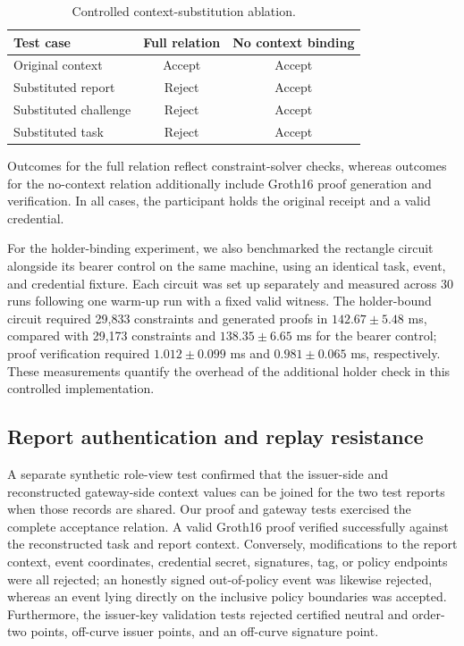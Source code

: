 \documentclass[pdflatex,iicol,sn-mathphys-num]{sn-jnl}
\begin{document}
\begin{table}[t]
\centering\footnotesize\setlength{\tabcolsep}{3pt}\caption{Controlled context-substitution ablation.}\label{tab:context-ablation}
\begin{tabular}{@{}lcc@{}}\toprule
Test case & Full relation & No context binding \\\midrule
Original context & Accept & Accept \\
Substituted report & Reject & Accept \\
Substituted challenge & Reject & Accept \\
Substituted task & Reject & Accept \\\bottomrule
\end{tabular}\par\vspace{2pt}
\footnotesize Outcomes for the full relation reflect constraint-solver checks, whereas outcomes for the no-context relation additionally include Groth16 proof generation and verification. In all cases, the participant holds the original receipt and a valid credential.
\end{table}

For the holder-binding experiment, we also benchmarked the rectangle circuit alongside its bearer control on the same machine, using an identical task, event, and credential fixture. Each circuit was set up separately and measured across 30 runs following one warm-up run with a fixed valid witness. The holder-bound circuit required 29,833 constraints and generated proofs in $142.67\pm5.48$ ms, compared with 29,173 constraints and $138.35\pm6.65$ ms for the bearer control; proof verification required $1.012\pm0.099$ ms and $0.981\pm0.065$ ms, respectively. These measurements quantify the overhead of the additional holder check in this controlled implementation.

\subsection{Report authentication and replay resistance}
A separate synthetic role-view test confirmed that the issuer-side and reconstructed gateway-side context values can be joined for the two test reports when those records are shared. Our proof and gateway tests exercised the complete acceptance relation. A valid Groth16 proof verified successfully against the reconstructed task and report context. Conversely, modifications to the report context, event coordinates, credential secret, signatures, tag, or policy endpoints were all rejected; an honestly signed out-of-policy event was likewise rejected, whereas an event lying directly on the inclusive policy boundaries was accepted. Furthermore, the issuer-key validation tests rejected certified neutral and order-two points, off-curve issuer points, and an off-curve signature point.
\end{document}
